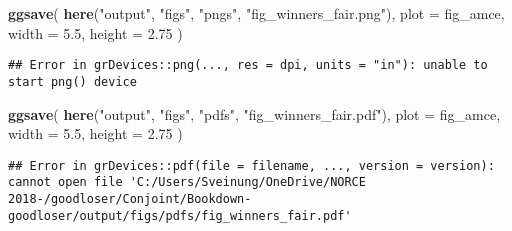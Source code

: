 \documentclass[]{book}
\newenvironment{Shaded}{\begin{snugshade}}{\end{snugshade}}
\newcommand{\KeywordTok}[1]{\textcolor[rgb]{0.13,0.29,0.53}{\textbf{#1}}}
\newcommand{\DataTypeTok}[1]{\textcolor[rgb]{0.13,0.29,0.53}{#1}}
\newcommand{\FloatTok}[1]{\textcolor[rgb]{0.00,0.00,0.81}{#1}}
\newcommand{\StringTok}[1]{\textcolor[rgb]{0.31,0.60,0.02}{#1}}
\newcommand{\NormalTok}[1]{#1}
\begin{document}
\begin{Shaded}
\begin{Highlighting}[]
\KeywordTok{ggsave}\NormalTok{(}
  \KeywordTok{here}\NormalTok{(}\StringTok{"output"}\NormalTok{, }\StringTok{"figs"}\NormalTok{, }\StringTok{"pngs"}\NormalTok{, }\StringTok{"fig_winners_fair.png"}\NormalTok{),}
  \DataTypeTok{plot =}\NormalTok{ fig_amce,}
  \DataTypeTok{width =} \FloatTok{5.5}\NormalTok{, }\DataTypeTok{height =} \FloatTok{2.75}
\NormalTok{)}
\end{Highlighting}
\end{Shaded}

\begin{verbatim}
## Error in grDevices::png(..., res = dpi, units = "in"): unable to start png() device
\end{verbatim}

\begin{Shaded}
\begin{Highlighting}[]
\KeywordTok{ggsave}\NormalTok{(}
  \KeywordTok{here}\NormalTok{(}\StringTok{"output"}\NormalTok{, }\StringTok{"figs"}\NormalTok{, }\StringTok{"pdfs"}\NormalTok{, }\StringTok{"fig_winners_fair.pdf"}\NormalTok{),}
  \DataTypeTok{plot =}\NormalTok{ fig_amce,}
  \DataTypeTok{width =} \FloatTok{5.5}\NormalTok{, }\DataTypeTok{height =} \FloatTok{2.75}
\NormalTok{)}
\end{Highlighting}
\end{Shaded}

\begin{verbatim}
## Error in grDevices::pdf(file = filename, ..., version = version): cannot open file 'C:/Users/Sveinung/OneDrive/NORCE 2018-/goodloser/Conjoint/Bookdown-goodloser/output/figs/pdfs/fig_winners_fair.pdf'
\end{verbatim}
\end{document}
